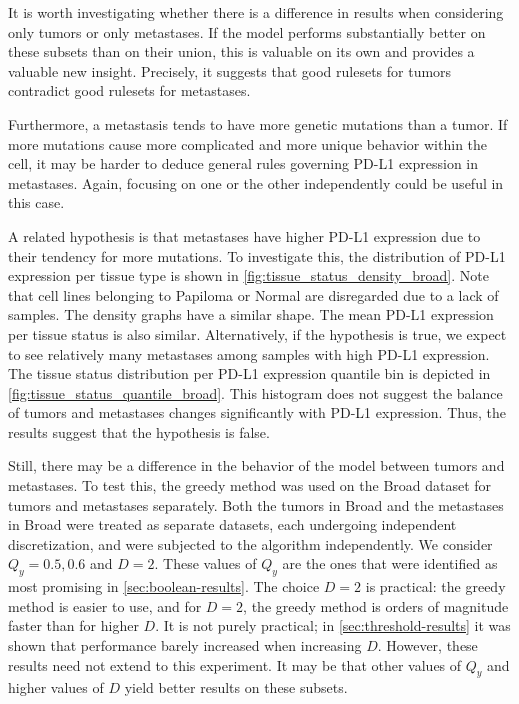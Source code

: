 It is worth investigating whether there is a difference in results when considering only tumors or only metastases.
If the model performs substantially better on these subsets than on their union,
this is valuable on its own and provides a valuable new insight.
Precisely, it suggests that good rulesets for tumors contradict good rulesets for metastases.

Furthermore, a metastasis tends to have more genetic mutations than a tumor.
If more mutations cause more complicated and more unique behavior within the cell,
it may be harder to deduce general rules governing PD-L1 expression in metastases.
Again, focusing on one or the other independently could be useful in this case.

A related hypothesis is that metastases have higher PD-L1 expression due to their tendency for more mutations.
To investigate this, the distribution of PD-L1 expression per tissue type is shown in \autoref{fig:tissue_status_density_broad}.
Note that cell lines belonging to Papiloma or Normal are disregarded due to a lack of samples.
The density graphs have a similar shape.
The mean PD-L1 expression per tissue status is also similar.
Alternatively, if the hypothesis is true, we expect to see relatively many metastases among samples with high PD-L1 expression.
The tissue status distribution per PD-L1 expression quantile bin is depicted in \autoref{fig:tissue_status_quantile_broad}.
This histogram does not suggest the balance of tumors and metastases changes significantly with PD-L1 expression.
Thus, the results suggest that the hypothesis is false.

Still, there may be a difference in the behavior of the model between tumors and metastases.
To test this, the greedy method was used on the Broad dataset for tumors and metastases separately.
Both the tumors in Broad and the metastases in Broad were treated as separate datasets,
each undergoing independent discretization, and were subjected to the algorithm independently.
We consider $Q_y = 0.5, 0.6$ and $D=2$.
These values of $Q_y$ are the ones that were identified as most promising in \autoref{sec:boolean-results}.
The choice $D=2$ is practical: the greedy method is easier to use,
and for $D=2$, the greedy method is orders of magnitude faster than for higher $D$.
It is not purely practical;
in \autoref{sec:threshold-results} it was shown that performance barely increased when increasing $D$.
However, these results need not extend to this experiment.
It may be that other values of $Q_y$ and higher values of $D$ yield better results on these subsets.

